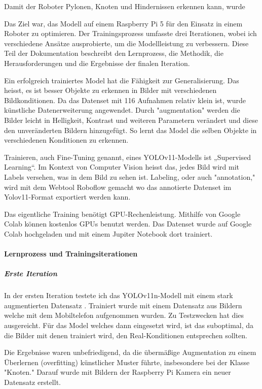 Damit der Roboter Pylonen, Knoten und Hindernissen erkennen kann, wurde

Das Ziel war, das Modell auf einem Raspberry Pi 5 für den Einsatz in einem Roboter zu optimieren. Der Trainingsprozess umfasste drei Iterationen, wobei ich verschiedene Ansätze ausprobierte, um die Modellleistung zu verbessern. Diese Teil der Dokumentation beschreibt den Lernprozess, die Methodik, die Herausforderungen und die Ergebnisse der finalen Iteration.

Ein erfolgreich trainiertes Model hat die Fähigkeit zur Generalisierung. Das heisst, es ist besser Objekte zu erkennen in Bilder mit verschiedenen Bildkonditionen. Da das Datenset mit 116 Aufnahmen relativ klein ist, wurde künstliche Datenerweiterung angewendet. Durch "augmentation" werden die Bilder leicht in Helligkeit, Kontrast und weiteren Parametern verändert und diese den unveränderten Bildern hinzugefügt. So lernt das Model die selben Objekte in verschiedenen Konditionen zu erkennen.

Trainieren, auch Fine-Tuning genannt, eines YOLOv11-Modells ist „Supervised Learning“. Im Kontext von Computer Vision heisst das, jedes Bild wird mit Labels versehen, was in dem Bild zu sehen ist. Labeling, oder auch "annotation," wird mit dem Webtool Roboflow gemacht wo das annotierte Datenset im Yolov11-Format exportiert werden kann. 

Das eigentliche Training benötigt GPU-Rechenleistung. Mithilfe von Google Colab können kostenlos GPUs benutzt werden. Das Datenset wurde auf Google Colab hochgeladen und mit einem Jupiter Notebook dort trainiert.

\paragraph{Lernprozess und Trainingsiterationen}

\subparagraph{Erste Iteration}

In der ersten Iteration testete ich das YOLOv11n-Modell mit einem stark augmentierten Datensatz . Trainiert wurde mit einem Datensatz aus Bildern welche mit dem Mobiltelefon aufgenommen wurden. Zu Testzwecken hat dies ausgereicht. Für das Model welches dann eingesetzt wird, ist das suboptimal, da die Bilder mit denen trainiert wird, den Real-Konditionen entsprechen sollten.

Die Ergebnisse waren unbefriedigend, da die übermäßige Augmentation zu einem Überlernen (overfitting) künstlicher Muster führte, insbesondere bei der Klasse "Knoten." Darauf wurde mit Bildern der Raspberry Pi Kamera ein neuer Datensatz erstellt.


